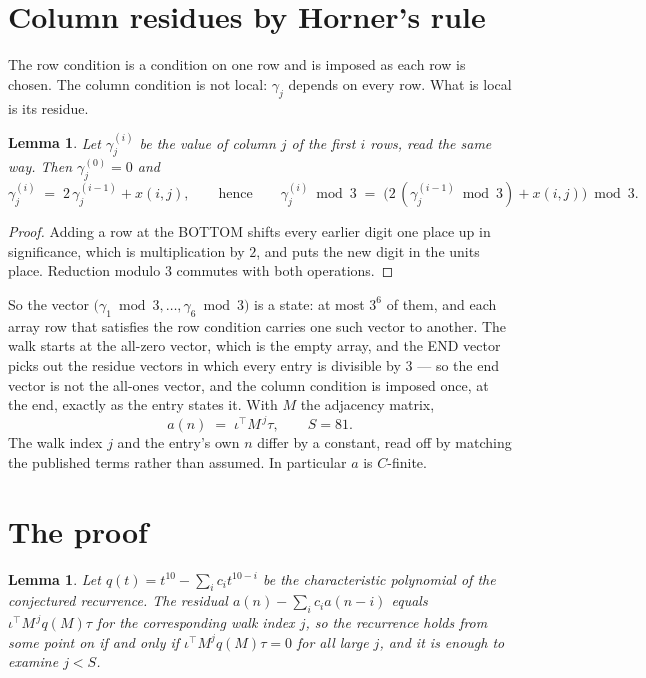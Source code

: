 \documentclass[11pt,a4paper]{article}
\theoremstyle{plain}
\newtheorem{lemma}[theorem]{Lemma}
\theoremstyle{definition}
\begin{document}
\section{Column residues by Horner's rule}

The row condition is a condition on one row and is imposed as each row is chosen. The column
condition is not local: $\gamma_j$ depends on every row. What is local is its residue.

\begin{lemma}\label{lem:horner}
Let $\gamma_j^{(i)}$ be the value of column $j$ of the first $i$ rows, read the same way.
Then $\gamma_j^{(0)}=0$ and
\[
\gamma_j^{(i)}\;=\;2\,\gamma_j^{(i-1)}+x(i,j),
\qquad\text{hence}\qquad
\gamma_j^{(i)}\bmod 3\;=\;
\bigl(2\,(\gamma_j^{(i-1)}\bmod 3)+x(i,j)\bigr)\bmod 3 .
\]
\end{lemma}

\begin{proof}
Adding a row at the BOTTOM shifts every earlier digit one place up in significance, which is
multiplication by $2$, and puts the new digit in the units place. Reduction modulo
$3$ commutes with both operations.
\end{proof}

So the vector $\bigl(\gamma_1\bmod 3,\dots,\gamma_{6}\bmod
3\bigr)$ is a state: at most $3^{6}$ of them, and each array row
that satisfies the row condition carries one such vector to another. The walk starts at the
all-zero vector, which is the empty array, and the END vector picks out the residue vectors in
which every entry is divisible by $3$ --- so the end vector is not the all-ones
vector, and the column condition is imposed once, at the end, exactly as the entry states it.
With $M$ the adjacency matrix,
\[
a(n)\;=\;\iota^{\!\top}M^{\,j}\tau ,\qquad S=81.
\]
The walk index $j$ and the entry's own $n$ differ by a constant, read off by matching the
published terms rather than assumed. In particular $a$ is $C$-finite.

\section{The proof}

\begin{lemma}\label{lem:crit}
Let $q(t)=t^{10}-\sum_i c_it^{10-i}$ be the characteristic polynomial of the
conjectured recurrence. The residual $a(n)-\sum_ic_ia(n-i)$ equals
$\iota^{\!\top}M^{\,j}q(M)\tau$ for the corresponding walk index $j$, so the recurrence
holds from some point on if and only if $\iota^{\!\top}M^{j}q(M)\tau=0$ for all large $j$,
and it is enough to examine $j<S$.
\end{lemma}
\end{document}

